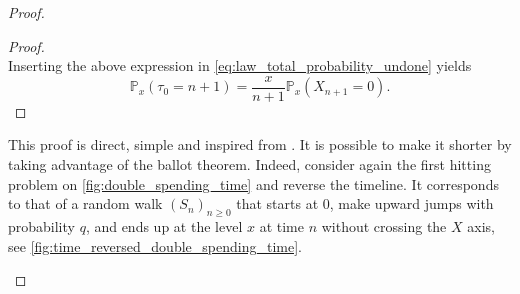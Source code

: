 \begin{proof}
\begin{proof}
$$$$
Inserting the above expression in \eqref{eq:law_total_probability_undone} yields 
$$
\mathbb{P}_x(\tau_0 = n+1) = \frac{x}{n+1}\mathbb{P}_x(X_{n+1} = 0).
$$
\end{proof}
\begin{remark}
This proof is direct, simple and inspired from \citet{Hofstad2008}. It is possible to make it shorter by taking advantage of the ballot theorem. Indeed, consider again the first hitting problem on \cref{fig:double_spending_time} and reverse the timeline. It corresponds to that of a random walk $(S_n)_{n\geq0}$ that starts at $0$, make upward jumps with probability $q$, and ends up at the level $x$ at time $n$ without crossing the $X$ axis, see \cref{fig:time_reversed_double_spending_time}.
\begin{figure}[ht!]
\begin{center}
\end{center}
\end{figure}
\end{remark}
\end{proof}
